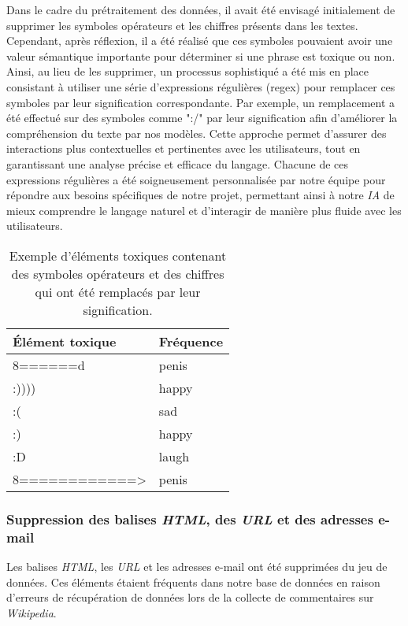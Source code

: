 Dans le cadre du prétraitement des données, il avait été envisagé initialement de supprimer les symboles opérateurs et les chiffres présents dans les textes. Cependant, après réflexion, il a été réalisé que ces symboles pouvaient avoir une valeur sémantique importante pour déterminer si une phrase est toxique ou non. Ainsi, au lieu de les supprimer, un processus sophistiqué a été mis en place consistant à utiliser une série d'expressions régulières (regex) pour remplacer ces symboles par leur signification correspondante.
Par exemple, un remplacement a été effectué sur des symboles comme ":/" par leur signification afin d'améliorer la compréhension du texte par nos modèles.
Cette approche permet d'assurer des interactions plus contextuelles et pertinentes avec les utilisateurs, tout en garantissant une analyse précise et efficace du langage.
Chacune de ces expressions régulières a été soigneusement personnalisée par notre équipe pour répondre aux besoins spécifiques de notre projet, permettant ainsi à notre \textit{IA} de mieux comprendre le langage naturel et d'interagir de manière plus fluide avec les utilisateurs.

\begin{table}[h]
\centering
\begin{tabular}{|l|l|}
\hline
\textbf{Élément toxique} & \textbf{Fréquence} \\ \hline
8======d~~ & penis \\ \hline
:)))) & happy \\ \hline
:( & sad \\ \hline
:) & happy \\ \hline
:D & laugh \\ \hline
8============> & penis \\ \hline
\end{tabular}
\caption{Exemple d'éléments toxiques contenant des symboles opérateurs et des chiffres qui ont été remplacés par leur signification.}
\end{table}


\subsubsection*{Suppression des balises \textit{HTML}, des \textit{URL} et des adresses e-mail}

Les balises \textit{HTML}, les \textit{URL} et les adresses e-mail ont été supprimées du jeu de données. Ces éléments étaient fréquents dans notre base de données en raison d'erreurs de récupération de données lors de la collecte de commentaires sur \textit{Wikipedia}.

